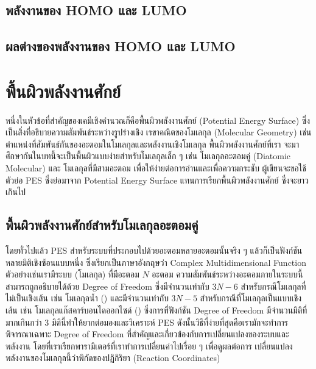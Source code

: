 \subsection{พลังงานของ HOMO และ LUMO}
\label{ssec:ener_homo_lumo}



\subsection{ผลต่างของพลังงานของ HOMO และ LUMO}
\label{sec:ener_diff_orb}


\section{พื้นผิวพลังงานศักย์}
\label{sec:pes}

หนึ่งในหัวข้อที่สำคัญของเคมีเชิงคำนวณก็คือพื้นผิวพลังงานศักย์ (Potential Energy Surface) ซึ่งเป็นสิ่งที่อธิบายความสัมพันธ์ระหว่างรูปร่างเชิง%
เรขาคณิตของโมเลกุล (Molecular Geometry) เช่น ตำแหน่งที่สัมพันธ์กันของอะตอมในโมเลกุลและพลังงานเชิงโมเลกุล พื้นผิวพลังงานศักย์ที่เรา%
จะมาศึกษากันในบทนี้จะเป็นพื้นผิวแบบง่ายสำหรับโมเลกุลเล็ก ๆ เช่น โมเลกุลอะตอมคู่ (Diatomic Molecular) และ โมเลกุลที่มีสามอะตอม
เพื่อให้ง่ายต่อการอ่านและเพื่อความกระชับ ผู้เขียนจะขอใช้ตัวย่อ PES ซึ่งย่อมาจาก Potential Energy Surface แทนการเรียกพื้นผิวพลังงานศักย์%
ซึ่งจะยาวเกินไป

\subsection{พื้นผิวพลังงานศักย์สำหรับโมเลกุลอะตอมคู่}
\label{ssec:pes_di_atomic}

โดยทั่วไปแล้ว PES สำหรับระบบที่ประกอบไปด้วยอะตอมหลายอะตอมนั้นจริง ๆ แล้วก็เป็นฟังก์ชันหลายมิติเชิงซ้อนแบบหนึ่ง ซึ่งเรียกเป็นภาษาอังกฤษว่า
Complex Multidimensional Function ตัวอย่างเช่นเรามีระบบ (โมเลกุล) ที่มีอะตอม $N$ อะตอม ความสัมพันธ์ระหว่างอะตอมภายในระบบนี้%
สามารถถูกอธิบายได้ด้วย Degree of Freedom ซึ่งมีจำนวนเท่ากับ $3N-6$ สำหรับกรณีโมเลกุลที่ไม่เป็นเชิงเส้น เช่น โมเลกุลน้ำ ()
และมีจำนวนเท่ากับ $3N-5$ สำหรับกรณีที่โมเลกุลเป็นแบบเชิงเส้น เช่น โมเลกุลแก๊สคาร์บอนไดออกไซด์ () ซึ่งการที่ฟังก์ชัน Degree
of Freedom มีจำนวนมิติที่มากเกินกว่า 3 มิตินี้ทำให้ยากต่อมองและวิเคราะห์ PES ดังนั้นวิธีที่ง่ายที่สุดคือเรามักจะทำการพิจารณาเฉพาะ Degree of
Freedom ที่สำคัญและเกี่ยวข้องกับการเปลี่ยนแปลงของระบบและพลังงาน โดยที่เราเรียกพารามิเตอร์ที่เราทำการเปลี่ยนค่าไปเรื่อย ๆ เพื่อดูผลต่อการ%
เปลี่ยนแปลงพลังงานของโมเลกุลนี้ว่าพิกัดของปฏิกิริยา (Reaction Coordinates)

